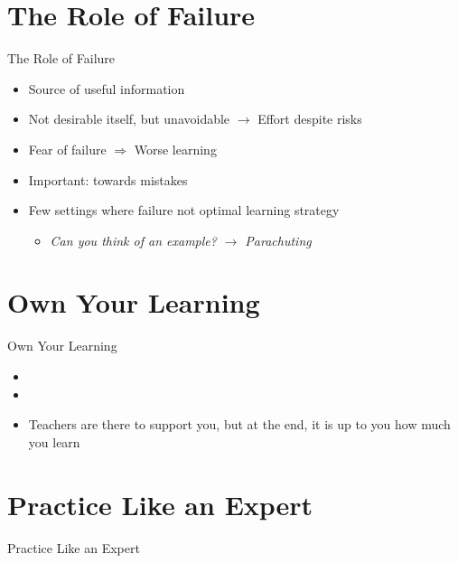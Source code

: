 \documentclass{ercisbeamer}
\begin{document}
\section{The Role of Failure}
\begin{frame}{The Role of Failure}
    \begin{itemize}
        \item Source of useful information
        \item Not desirable itself, but unavoidable $\rightarrow$ Effort despite risks
        \item Fear of failure $\Rightarrow$ Worse learning
        \item Important:  towards mistakes
        \item Few settings where failure not optimal learning strategy
        \begin{itemize}
            \item \emph{Can you think of an example?} \pause \emph{$\rightarrow$ Parachuting}
        \end{itemize}
    \end{itemize}
\end{frame}

\section{Own Your Learning}
\begin{frame}{Own Your Learning}
    \begin{tbox}
        \begin{itemize}
            \item {}
            \item {}
            \item Teachers are there to support you, but at the end, it is up to you how much you learn
        \end{itemize}
    \end{tbox}
\end{frame}
\setbgimage{}

\section{Practice Like an Expert}
\begin{frame}{Practice Like an Expert}
\end{frame}
\end{document}
